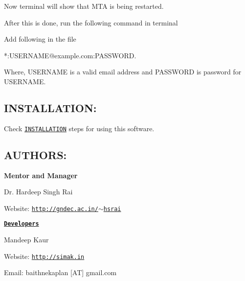 Now terminal will show that M\-T\-A is being restarted.\par
 After this is done, run the following command in terminal 


Add following in the file \begin{DoxyVerb}*:USERNAME@example.com:PASSWORD.

Where, USERNAME is  a valid email address and PASSWORD is  password for USERNAME.
\end{DoxyVerb}


\subsection*{I\-N\-S\-T\-A\-L\-L\-A\-T\-I\-O\-N\-: }

Check \href{https://github.com/GreatDevelopers/bakaplan/blob/master/INSTALLATION.txt}{\tt I\-N\-S\-T\-A\-L\-L\-A\-T\-I\-O\-N} steps for using this software.

\subsection*{A\-U\-T\-H\-O\-R\-S\-: }

{\bfseries Mentor and Manager}

Dr. Hardeep Singh Rai

Website\-: \href{http://gndec.ac.in/~hsrai}{\tt http\-://gndec.\-ac.\-in/$\sim$hsrai}

{\bfseries \href{https://github.com/GreatDevelopers/bakaplan/wiki/Contributors}{\tt Developers}}

Mandeep Kaur

Website\-: \href{http://simak.in}{\tt http\-://simak.\-in}

Email\-: baithnekaplan \mbox{[}A\-T\mbox{]} gmail.\-com 